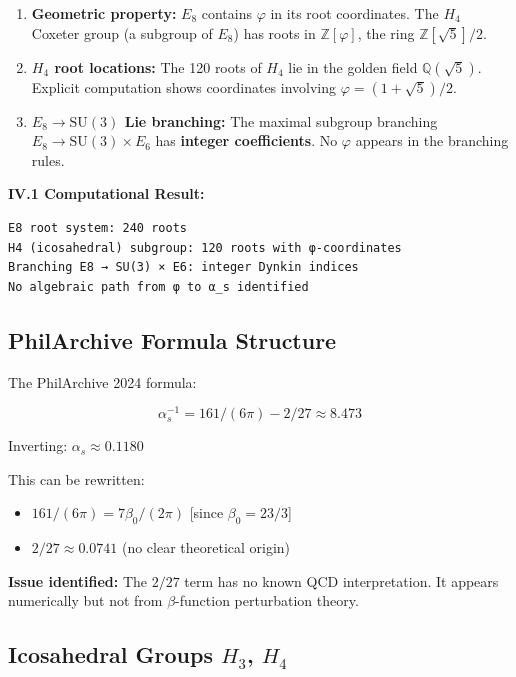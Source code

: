 \documentclass{article}
\begin{document}
\begin{enumerate}
\item \textbf{Geometric property:} $E_8$ contains $\varphi$ in its root coordinates. The $H_4$ Coxeter group (a subgroup of $E_8$) has roots in $\mathbb{Z}[\varphi]$, the ring $\mathbb{Z}[\sqrt{5}]/2$.

\item \textbf{$H_4$ root locations:} The 120 roots of $H_4$ lie in the golden field $\mathbb{Q}(\sqrt{5})$. Explicit computation shows coordinates involving $\varphi = (1+\sqrt{5})/2$.

\item \textbf{$E_8 \to \mathrm{SU}(3)$ Lie branching:} The maximal subgroup branching $E_8 \to \mathrm{SU}(3) \times E_6$ has \textbf{integer coefficients}. No $\varphi$ appears in the branching rules.
\end{enumerate}

\textbf{IV.1 Computational Result:}
\begin{verbatim}
E8 root system: 240 roots
H4 (icosahedral) subgroup: 120 roots with φ-coordinates
Branching E8 → SU(3) × E6: integer Dynkin indices
No algebraic path from φ to α_s identified
\end{verbatim}

\subsection{PhilArchive Formula Structure}

The PhilArchive 2024 formula:

\[
\alpha_s^{-1} = 161/(6\pi) - 2/27 \approx 8.473
\]

Inverting: $\alpha_s \approx 0.1180$

This can be rewritten:
\begin{itemize}
\item $161/(6\pi) = 7\beta_0/(2\pi)$  [since $\beta_0 = 23/3$]
\item $2/27 \approx 0.0741$  (no clear theoretical origin)
\end{itemize}

\textbf{Issue identified:} The $2/27$ term has no known QCD interpretation. It appears numerically but not from $\beta$-function perturbation theory.

\subsection{Icosahedral Groups $H_3$, $H_4$}
\end{document}
